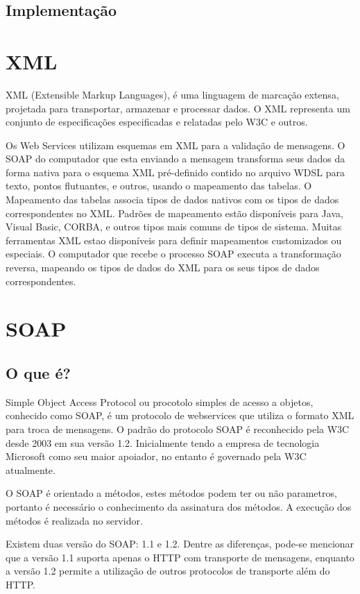 \documentclass{acm_proc_article-sp}
\begin{document}
	\subsection{Implementação}

\section{XML}
		XML (Extensible Markup Languages), é uma linguagem de marcação extensa, projetada para transportar, armazenar e processar dados. O XML representa um conjunto de especificações especificadas e relatadas pelo W3C e outros.

		Os Web Services utilizam esquemas em XML para a validação de mensagens. O SOAP do computador que esta enviando a mensagem transforma seus dados da forma nativa para o esquema XML pré-definido contido no arquivo WDSL para texto, pontos flutuantes, e outros, usando o mapeamento das tabelas. O Mapeamento das tabelas associa tipos de dados nativos com os tipos de dados correspondentes no XML. Padrões de mapeamento estão disponíveis para Java, Visual Basic, CORBA, e outros tipos mais comuns de tipos de sistema. Muitas ferramentas XML estao disponíveis para definir mapeamentos customizados ou especiais. O computador que recebe o processo SOAP executa a transformação reversa, mapeando os tipos de dados do XML para os seus tipos de dados correspondentes.\cite{UNDERWEBSERVICES}
 
\section{SOAP}
	\subsection{O que é?}
	
		Simple Object Access Protocol ou procotolo simples de acesso a objetos, conhecido como SOAP, é um protocolo de webservices que utiliza o formato XML para troca de mensagens. O padrão do protocolo SOAP é reconhecido pela W3C desde 2003 em sua versão 1.2. Inicialmente tendo a empresa de tecnologia Microsoft como seu maior apoiador, no entanto é governado pela W3C atualmente.
	
		O SOAP é orientado a métodos, estes métodos podem ter ou não parametros, portanto é necessário o conhecimento da assinatura dos métodos. A execução dos métodos é realizada no servidor.
		
		Existem duas versão do SOAP: 1.1 e 1.2. Dentre as diferenças, pode-se mencionar que a versão 1.1 suporta apenas o HTTP com transporte de mensagens, enquanto a versão 1.2 permite a utilização de outros protocolos de transporte além do HTTP. \cite{WEBSERVICESZEND}
		
\end{document}
